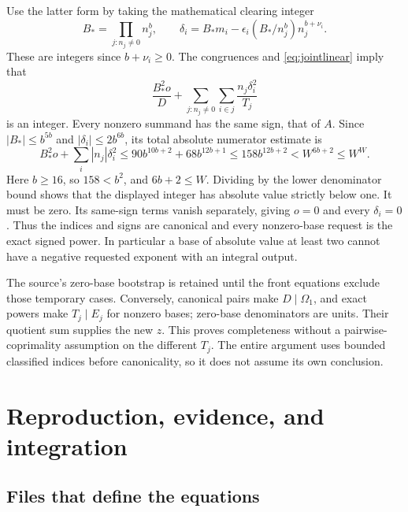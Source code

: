 \documentclass[10pt,letterpaper]{article}
\theoremstyle{remark}\newtheorem{remark}[theorem]{Remark}
\begin{document}
Use the latter form by taking the mathematical clearing integer
\[
 B_* =\prod_{j:n_j\ne0}n_j^b,\qquad
 \delta_i=B_*m_i-\epsilon_i(B_*/n_j^b)n_j^{b+\nu_i}.
\]
These are integers since $b+\nu_i\ge0$. The congruences and
\eqref{eq:jointlinear} imply that
\[
 \frac{B_*^2o}{D}
   +\sum_{j:n_j\ne0}\sum_{i\in j}\frac{n_j\delta_i^2}{T_j}
\]
is an integer. Every nonzero summand has the same sign, that of $A$.
Since $|B_*|\le b^{5b}$ and $|\delta_i|\le2b^{6b}$, its total absolute
numerator estimate is
\[
 B_*^2o+\sum_i|n_j|\delta_i^2
 \le90b^{10b+2}+68b^{12b+1}
 \le158b^{12b+2}<W^{6b+2}\le W^W.
\]
Here $b\ge16$, so $158<b^2$, and $6b+2\le W$. Dividing by the lower
denominator bound shows that the displayed integer has absolute value
strictly below one. It must be zero. Its same-sign terms vanish
separately, giving $o=0$ and every $\delta_i=0$. Thus the indices and
signs are canonical and every nonzero-base request is the exact signed
power. In particular a base of absolute value at least two cannot have
a negative requested exponent with an integral output.

The source's zero-base bootstrap is retained until the front equations
exclude those temporary cases. Conversely, canonical pairs make
$D\mid\Omega_1$, and exact powers make $T_j\mid E_j$ for nonzero bases;
zero-base denominators are units. Their quotient sum supplies the new $z$.
This proves completeness without a pairwise-coprimality assumption on the
different $T_j$. The entire argument uses bounded classified indices
before canonicality, so it does not assume its own conclusion.



\section{Reproduction, evidence, and integration}

\subsection{Files that define the equations}
\end{document}
